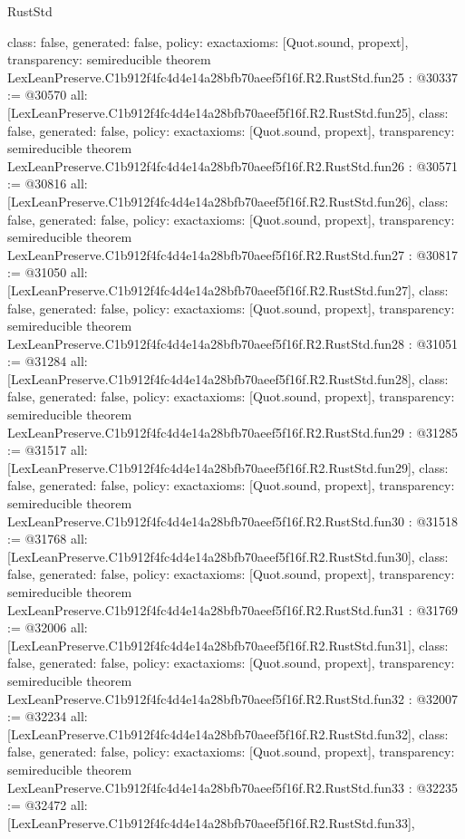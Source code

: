 \begin{lexlean}{RustStd}
\begin{coremodule}
{  class: false,
  generated: false,
  policy: exact{axioms: [Quot.sound, propext]},
  transparency: semireducible
}
theorem LexLeanPreserve.C1b912f4fc4d4e14a28bfb70aeef5f16f.R2.RustStd.fun25 : @30337 := @30570 {
  all: [LexLeanPreserve.C1b912f4fc4d4e14a28bfb70aeef5f16f.R2.RustStd.fun25],
  class: false,
  generated: false,
  policy: exact{axioms: [Quot.sound, propext]},
  transparency: semireducible
}
theorem LexLeanPreserve.C1b912f4fc4d4e14a28bfb70aeef5f16f.R2.RustStd.fun26 : @30571 := @30816 {
  all: [LexLeanPreserve.C1b912f4fc4d4e14a28bfb70aeef5f16f.R2.RustStd.fun26],
  class: false,
  generated: false,
  policy: exact{axioms: [Quot.sound, propext]},
  transparency: semireducible
}
theorem LexLeanPreserve.C1b912f4fc4d4e14a28bfb70aeef5f16f.R2.RustStd.fun27 : @30817 := @31050 {
  all: [LexLeanPreserve.C1b912f4fc4d4e14a28bfb70aeef5f16f.R2.RustStd.fun27],
  class: false,
  generated: false,
  policy: exact{axioms: [Quot.sound, propext]},
  transparency: semireducible
}
theorem LexLeanPreserve.C1b912f4fc4d4e14a28bfb70aeef5f16f.R2.RustStd.fun28 : @31051 := @31284 {
  all: [LexLeanPreserve.C1b912f4fc4d4e14a28bfb70aeef5f16f.R2.RustStd.fun28],
  class: false,
  generated: false,
  policy: exact{axioms: [Quot.sound, propext]},
  transparency: semireducible
}
theorem LexLeanPreserve.C1b912f4fc4d4e14a28bfb70aeef5f16f.R2.RustStd.fun29 : @31285 := @31517 {
  all: [LexLeanPreserve.C1b912f4fc4d4e14a28bfb70aeef5f16f.R2.RustStd.fun29],
  class: false,
  generated: false,
  policy: exact{axioms: [Quot.sound, propext]},
  transparency: semireducible
}
theorem LexLeanPreserve.C1b912f4fc4d4e14a28bfb70aeef5f16f.R2.RustStd.fun30 : @31518 := @31768 {
  all: [LexLeanPreserve.C1b912f4fc4d4e14a28bfb70aeef5f16f.R2.RustStd.fun30],
  class: false,
  generated: false,
  policy: exact{axioms: [Quot.sound, propext]},
  transparency: semireducible
}
theorem LexLeanPreserve.C1b912f4fc4d4e14a28bfb70aeef5f16f.R2.RustStd.fun31 : @31769 := @32006 {
  all: [LexLeanPreserve.C1b912f4fc4d4e14a28bfb70aeef5f16f.R2.RustStd.fun31],
  class: false,
  generated: false,
  policy: exact{axioms: [Quot.sound, propext]},
  transparency: semireducible
}
theorem LexLeanPreserve.C1b912f4fc4d4e14a28bfb70aeef5f16f.R2.RustStd.fun32 : @32007 := @32234 {
  all: [LexLeanPreserve.C1b912f4fc4d4e14a28bfb70aeef5f16f.R2.RustStd.fun32],
  class: false,
  generated: false,
  policy: exact{axioms: [Quot.sound, propext]},
  transparency: semireducible
}
theorem LexLeanPreserve.C1b912f4fc4d4e14a28bfb70aeef5f16f.R2.RustStd.fun33 : @32235 := @32472 {
  all: [LexLeanPreserve.C1b912f4fc4d4e14a28bfb70aeef5f16f.R2.RustStd.fun33],
}
\end{coremodule}
\end{lexlean}
